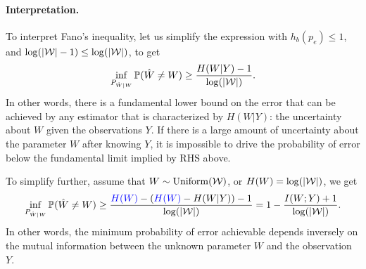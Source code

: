 \documentclass[12pt]{article}
\begin{document}
\paragraph{Interpretation.} To interpret Fano's inequality, let us simplify the expression with $h_b(p_e) \leq 1$, and $\log(|{\cal W}|-1) \leq \log(|{\cal W}|)$, to get 
\begin{align}
\inf_{P_{\hat{W}|W}}\mathbb{P}(\hat{W} \neq W) \geq \frac{H(W|Y) - 1}{\log(|{\cal W}|)}. 
\end{align}
In other words, there is a fundamental lower bound on the error that can be achieved by any estimator that is characterized by $H(W|Y)$: the uncertainty about $W$ given the observations $Y$. If there is a large amount of uncertainty about the parameter $W$ after knowing $Y$, it is impossible to drive the probability of error below the fundamental limit implied by RHS above. 

To simplify further, assume that $W  \sim \mathrm{Uniform}({\cal W})$, or $H(W) = \log(|{\cal W}|)$, we get 
\begin{align}
\inf_{P_{\hat{W}|W}}\mathbb{P}(\hat{W} \neq W) \geq \frac{\textcolor{blue}{H(W)} - (\textcolor{blue}{ H(W)} - H(W|Y)) - 1}{\log(|{\cal W}|)} = 1 - \frac{I(W;Y)+1}{\log(|{\cal W}|)}. 
\end{align}
In other words, the minimum probability of error achievable depends inversely on the mutual information between the unknown parameter $W$ and the observation $Y$. 
\end{document}
